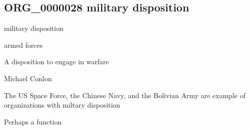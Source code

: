 \documentclass[letterpaper,10pt,english]{sphinxmanual}
\begin{document}
\subsection{ORG\_0000028 \sphinxhyphen{} military disposition}
\label{\detokenize{doc-ORG_0000028:org-0000028-military-disposition}}\label{\detokenize{doc-ORG_0000028:index-0}}\label{\detokenize{doc-ORG_0000028::doc}}
\begin{sphinxShadowBox}

\sphinxAtStartPar
military disposition
\end{sphinxShadowBox}

\begin{sphinxShadowBox}

\sphinxAtStartPar
armed forces
\end{sphinxShadowBox}

\begin{sphinxShadowBox}

\sphinxAtStartPar
{\hyperref[\detokenize{doc-BFO_0000016::doc}]{}}
\end{sphinxShadowBox}

\begin{sphinxShadowBox}

\sphinxAtStartPar
A disposition to engage in warfare
\end{sphinxShadowBox}

\begin{sphinxShadowBox}

\sphinxAtStartPar
Michael Conlon 
\end{sphinxShadowBox}

\begin{sphinxShadowBox}

\sphinxAtStartPar
The US Space Force, the Chinese Navy, and the Bolivian Army are example of organizations with miltary disposition
\end{sphinxShadowBox}

\begin{sphinxShadowBox}

\sphinxAtStartPar
Perhaps a function
\end{sphinxShadowBox}
\end{document}
